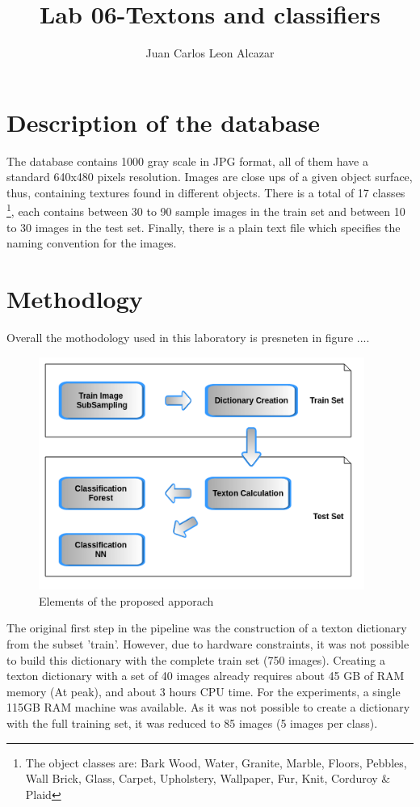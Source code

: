 \documentclass[a4paper]{article}
\title{Lab 06-Textons and classifiers}
\author{Juan Carlos Leon Alcazar}
\begin{document}
\maketitle

\section{Description of the database}

The database\cite{Lazebnik2005} contains 1000 gray scale in JPG format, all of them have a standard 640x480 pixels resolution. Images are close ups of a given object surface, thus, containing textures found in different objects. There is a total of 17 classes \footnote{The object classes are: Bark Wood, Water, Granite, Marble, Floors, Pebbles, Wall Brick, Glass, Carpet, Upholstery, Wallpaper, Fur, Knit, Corduroy \& Plaid }, each contains between 30 to 90 sample images in the train set and between 10 to 30 images in the test set. Finally, there is a plain text file which specifies the naming convention for the images.


\section{Methodlogy}

Overall the mothodology used in this laboratory is presneten in figure ....

\begin{figure}[!ht]
	\centering
   \includegraphics[width=0.95\textwidth]{img/Pipeline.png}
 	\caption{Elements of the proposed apporach}
\end{figure}

The original first step in the pipeline was the construction of a texton dictionary from the subset 'train'.  However, due to hardware constraints, it was not possible to build this dictionary with the complete train set (750 images). Creating a texton dictionary with a set of 40 images already requires about 45 GB of RAM memory (At peak), and about 3 hours CPU time. For the experiments, a single 115GB RAM machine was available. As it was not possible to create a dictionary with the full training set, it was reduced to 85 images (5 images per class).
\end{document}

